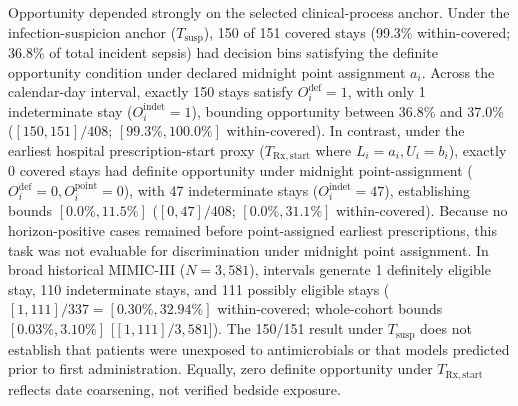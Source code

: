 \documentclass[12pt,a4paper]{article}
\begin{document}
Opportunity depended strongly on the selected clinical-process anchor. Under the infection-suspicion anchor ($T_{\mathrm{susp}}$), 150 of 151 covered stays (99.3\% within-covered; 36.8\% of total incident sepsis) had decision bins satisfying the definite opportunity condition under declared midnight point assignment $a_i$. Across the calendar-day interval, exactly 150 stays satisfy $O_i^{\mathrm{def}} = 1$, with only 1 indeterminate stay ($O_i^{\mathrm{indet}} = 1$), bounding opportunity between 36.8\% and 37.0\% ($[150, 151]/408$; $[99.3\%, 100.0\%]$ within-covered). In contrast, under the earliest hospital prescription-start proxy ($T_{\mathrm{Rx,start}}$ where $L_i=a_i, U_i=b_i$), exactly 0 covered stays had definite opportunity under midnight point-assignment ($O_i^{\mathrm{def}} = 0, O_i^{\mathrm{point}} = 0$), with 47 indeterminate stays ($O_i^{\mathrm{indet}} = 47$), establishing bounds $[0.0\%, 11.5\%]$ ($[0, 47]/408$; $[0.0\%, 31.1\%]$ within-covered). Because no horizon-positive cases remained before point-assigned earliest prescriptions, this task was not evaluable for discrimination under midnight point assignment. In broad historical MIMIC-III ($N=3,581$), intervals generate 1 definitely eligible stay, 110 indeterminate stays, and 111 possibly eligible stays ($[1, 111]/337 = [0.30\%, 32.94\%]$ within-covered; whole-cohort bounds $[0.03\%, 3.10\%]$ [$[1, 111]/3,581$]). The 150/151 result under $T_{\mathrm{susp}}$ does not establish that patients were unexposed to antimicrobials or that models predicted prior to first administration. Equally, zero definite opportunity under $T_{\mathrm{Rx,start}}$ reflects date coarsening, not verified bedside exposure.
\end{document}
